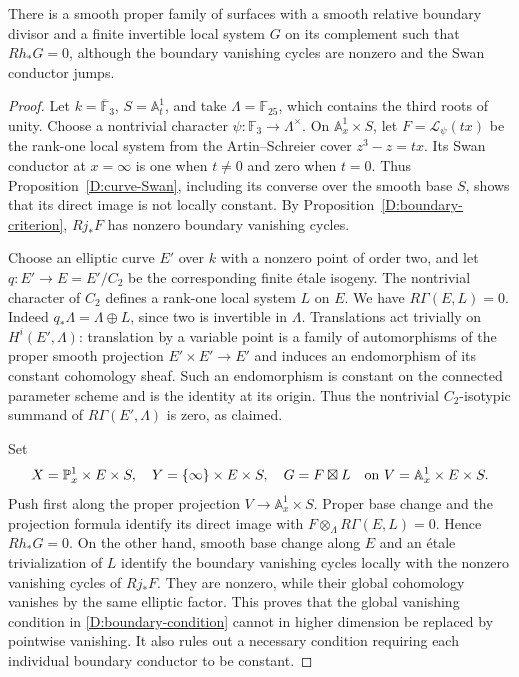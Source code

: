 \begin{proposition}\label{D:boundary-cancellation}
There is a smooth proper family of surfaces with a smooth relative
boundary divisor and a finite invertible local system $G$ on its
complement such that $Rh_*G=0$, although the boundary vanishing
cycles are nonzero and the Swan conductor jumps.
\end{proposition}
\begin{proof}
Let $k=\overline{\mathbb F}_3$, $S=\mathbb A^1_t$, and take
$\Lambda=\mathbb F_{25}$, which contains the third roots of unity.
Choose a nontrivial character $\psi:\mathbb F_3\to\Lambda^\times$.
On $\mathbb A^1_x\times S$, let $F=\mathcal L_\psi(tx)$ be the
rank-one local system from the Artin--Schreier cover
$z^3-z=tx$. Its Swan conductor at $x=\infty$ is one when $t\ne0$
and zero when $t=0$. Thus Proposition~\ref{D:curve-Swan}, including
its converse over the smooth base $S$, shows that its direct image
is not locally constant. By Proposition~\ref{D:boundary-criterion},
$Rj_*F$ has nonzero boundary vanishing cycles.

Choose an elliptic curve $E'$ over $k$ with a nonzero point of order
two, and let $q:E'\to E=E'/C_2$ be the corresponding finite
\'etale isogeny. The nontrivial character of $C_2$ defines a
rank-one local system $L$ on $E$. We have $R\Gamma(E,L)=0$.
Indeed $q_*\Lambda=\Lambda\oplus L$, since two is invertible
in $\Lambda$. Translations act trivially on $H^i(E',\Lambda)$:
translation by a variable point is a family of automorphisms of
the proper smooth projection $E'\times E'\to E'$ and induces an
endomorphism of its constant cohomology sheaf. Such an endomorphism
is constant on the connected parameter scheme and is the identity
at its origin. Thus the nontrivial $C_2$-isotypic summand of
$R\Gamma(E',\Lambda)$ is zero, as claimed.

Set
\[
 X=\mathbb P^1_x\times E\times S,\quad
 Y=\{\infty\}\times E\times S,\quad
 G=F\boxtimes L\quad\hbox{on }V=\mathbb A^1_x\times E\times S.
\]
Push first along the proper projection $V\to\mathbb A^1_x\times S$.
Proper base change and the projection formula identify its direct
image with $F\otimes_\Lambda R\Gamma(E,L)=0$. Hence $Rh_*G=0$.
On the other hand, smooth base change along $E$ and an \'etale
trivialization of $L$ identify the boundary vanishing cycles locally
with the nonzero vanishing cycles of $Rj_*F$. They are nonzero,
while their global cohomology vanishes by the same elliptic factor.
This proves that the global vanishing condition in
\eqref{D:boundary-condition} cannot in higher dimension be replaced
by pointwise vanishing. It also rules out a necessary condition
requiring each individual boundary conductor to be constant.
\end{proof}


